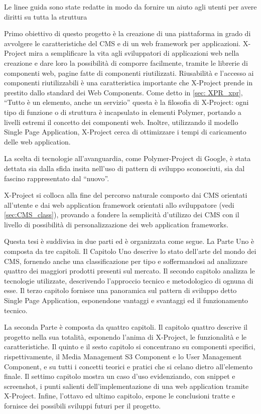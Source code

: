 Le linee guida sono state redatte in modo da fornire un aiuto agli utenti per avere diritti su tutta la struttura

Primo obiettivo di questo progetto è la creazione di una piattaforma in grado di avvolgere le caratteristiche del CMS e di un web framework per applicazioni.
X-Project mira a semplificare la vita agli sviluppatori di applicazioni web nella creazione e dare loro la possibilità di comporre facilmente, tramite le librerie di componenti web, pagine fatte di componenti riutilizzati.
Riusabilità e l'accesso ai componenti riutilizzabili è una caratteristica importante che X-Project prende in prestito dallo standard dei Web Components.
Come detto in \ref{sec: XPR_xpr}, ``Tutto è un elemento, anche un servizio'' questa è la filosofia di X-Project: ogni tipo di funzione o di struttura è incapsulato in elementi Polymer, portando a livelli estremi il concetto dei componenti web.
Inoltre, utilizzando il modello Single Page Application, X-Project cerca di ottimizzare i tempi di caricamento delle web application.

La scelta di tecnologie all'avanguardia, come Polymer-Project di Google, è stata dettata sia dalla sfida insita nell'uso di pattern di sviluppo sconosciuti, sia dal fascino rappresentato dal ``nuovo''. 

X-Project si colloca alla fine del percorso naturale composto dai CMS orientati all'utente e dai web application framework orientati allo sviluppatore (vedi \ref{sec:CMS_class}), provando a fondere la semplicità d'utilizzo dei CMS con il livello di possibilità di personalizzazione dei web application frameworks.

Questa tesi è suddivisa in due parti ed è organizzata come segue. La Parte Uno è composta da tre capitoli. Il Capitolo Uno descrive lo stato dell'arte del mondo dei CMS, fornendo anche una classificazione per tipo e soffermandosi ad analizzare quattro dei maggiori prodotti presenti sul mercato. Il secondo capitolo analizza le tecnologie utilizzate, descrivendo l'approccio tecnico e metodologico di ognuna di esse. Il terzo capitolo fornisce una panoramica sul pattern di sviluppo detto Single Page Application, esponendone vantaggi e svantaggi ed il funzionamento tecnico.

La seconda Parte è composta da quattro capitoli. Il capitolo quattro descrive il progetto nella sua totalità, esponendo l'anima di X-Project, le funzionalità e le caratteristiche.
Il quinto e il sesto capitolo si concentrano su componenti specifici, rispettivamente, il Media Management S3 Component e lo User Management Component, e su tutti i concetti teorici e pratici che si celano dietro all'elemento finale.
Il settimo capitolo mostra un caso d'uso evidenziando, con snippet e screenshot, i punti salienti dell'implementazione di una web application tramite X-Project.
Infine, l'ottavo ed ultimo capitolo, espone le conclusioni tratte e fornisce dei possibili sviluppi futuri per il progetto.